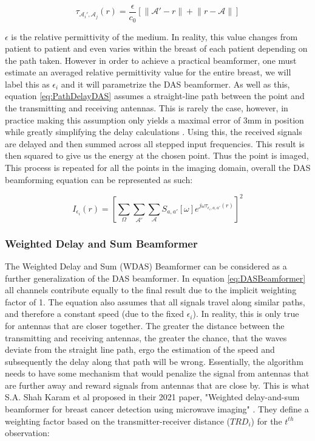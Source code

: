 \begingroup
\Large
\begin{equation}
    \tau_{\mathcal{A}_i', \mathcal{A}_j}(r) = \frac{\epsilon}{c_0} \left [\lVert \mathcal{A}' - r \rVert + \lVert r - \mathcal{A}\rVert\right ]
    \label{eq:PathDelayDAS}
\end{equation}
\endgroup


$\epsilon$ is the relative permittivity of the medium. In reality, this value changes from patient to patient and even
varies within the breast of each patient depending on the path taken. However in order to achieve a practical beamformer, one must estimate an
averaged relative permittivity value for the entire breast, we will label this as $\epsilon_i$ and it will parametrize
the DAS beamformer. As well as this, equation \ref{eq:PathDelayDAS} assumes a straight-line path between the point and
the transmitting and receiving antennas. This is rarely the case, however, in practice making this assumption
only yields a maximal error of 3mm in position while greatly simplifying the delay calculations
\cite{oloughlinParameterSearchAlgorithms2017}. Using this, the received signals are delayed and then summed across all
stepped input frequencies. This result is then squared to give us the energy at the chosen point. Thus the point is
imaged, This process is repeated for all the points in the imaging domain, overall the DAS beamforming equation can be
represented as such:

\begingroup
\Large
\begin{equation}
    I_{\epsilon_i}(r) = \left [\sum_{\Omega}\sum_{\mathcal{A}'}\sum_{\mathcal{A}} S_{a, a'}[\omega]e^{j\omega \tau_{\epsilon_i, a, a'}(r)}\right ]^2
    \label{eq:DASBeamformer}
\end{equation}
\endgroup

\subsubsection{Weighted Delay and Sum Beamformer}
The Weighted Delay and Sum (WDAS) Beamformer can be considered as a further generalization of the DAS beamformer.
In equation \ref{eq:DASBeamformer} all channels contribute equally to the final result due to the implicit weighting
factor of 1. The equation also assumes that all signals travel along similar paths, and therefore a constant speed (due
to the fixed $\epsilon_i$). In reality, this is only true for antennas that are closer together. The greater the
distance between the transmitting and receiving antennas, the greater the chance, that the waves deviate from the straight line
path, ergo the estimation of the speed and subsequently the delay along that path will be wrong. Essentially, the
algorithm needs to have some mechanism that would penalize the signal from antennas that are further away and reward
signals from antennas that are close by. This is what S.A. Shah Karam et al proposed in their 2021 paper, "Weighted delay-and-sum beamformer for breast cancer detection using
microwave imaging" \cite{shahkaramWeightedDelayandsumBeamformer2021}. They define a weighting factor based on the
transmitter-receiver distance ($TRD_i$) for
the $t^{th}$ observation:

